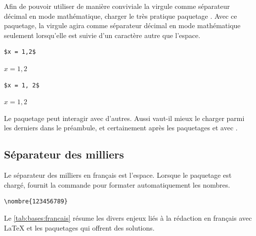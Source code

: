 Afin de pouvoir utiliser de manière conviviale la virgule comme
séparateur décimal en mode mathématique, charger le très pratique
paquetage  \citep{icomma}. Avec ce paquetage, la virgule
agira comme séparateur décimal en mode mathématique seulement
lorsqu'elle est suivie d'un caractère autre que l'espace.
\begin{demo}
  \begin{minipage}{0.45\linewidth}
    \begin{texample}
\begin{lstlisting}
$x = 1,2$
\end{lstlisting}
      \producing
      $x = 1,2$
    \end{texample}
  \end{minipage}
  \hfill
\begin{minipage}{0.45\linewidth}
    \begin{texample}
\begin{lstlisting}
$x = 1, 2$
\end{lstlisting}
      \producing
      $x = 1, 2$
    \end{texample}
  \end{minipage}
\end{demo}

\begin{important}
  Le paquetage  peut interagir avec d'autres. Aussi
  vaut-il mieux le charger parmi les derniers dans le préambule, et
  certainement après les paquetages  et
   avec {\XeLaTeX}.
\end{important}

\subsection{Séparateur des milliers}
\label{sec:bases:francais:milliers}

Le séparateur des milliers en français est l'espace. Lorsque le
paquetage  \citep{numprint} est chargé, 
fournit la commande \cmd{\nombre} pour formater automatiquement les
nombres.
\begin{demo}
  \begin{texample}
\begin{lstlisting}
\nombre{123456789}
\end{lstlisting}
    \producing
  \end{texample}
\end{demo}

Le \autoref{tab:bases:francais} résume les divers enjeux liés à la
rédaction en français avec {\LaTeX} et les paquetages qui offrent des
solutions.

